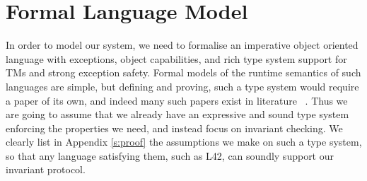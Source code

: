 \section{Formal Language Model}
\label{s:formalism}

In order to model our system, we need to formalise an imperative object oriented language
with exceptions, object capabilities, and rich type system
support for TMs and strong exception safety.
Formal models of the runtime semantics of such languages are simple, but 
defining and proving, such a type system would require a paper
of its own, and indeed many such papers exist in literature%
~\cite{ServettoEtAl13a,ServettoZucca15,GordonEtAl12,clebsch2015deny,JOT:issue_2011_01/article1}.
Thus we are going to assume that we already have an expressive and sound type system enforcing the properties we need, and instead focus on invariant checking.
We clearly list in Appendix \ref{s:proof} the assumptions we make on such a type system, so that any language satisfying them, such as L42, can soundly support our invariant protocol.

